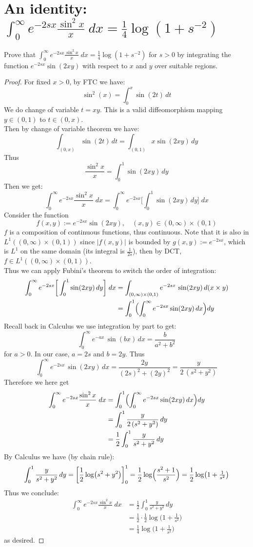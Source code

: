 \documentclass[lang=cn,11pt]{elegantbook}
\begin{document}
\section{An identity: $\int_0^\infty e^{-2sx}\frac{\sin^2x}{x}\;d x=\frac14\log(1+s^{-2})$}
  Prove that $\int_0^\infty e^{-2sx}\frac{\sin^2x}{x}\;d x=\frac14\log(1+s^{-2})$ for $s>0$ by integrating the function $e^{-2sx}\sin(2xy)$ with respect to $x$ and $y$ over suitable regions.
\begin{proof}
For fixed $x> 0$, by FTC we have:   \[\sin^2 (x)  = \int_0^x \sin(2t)\,dt\]
We do change of variable \(t = xy\). This is a valid diffeomorphism mapping $y\in (0,1)$ to $t \in (0,x)$.\\
Then by change of variable theorem we have: \[\int_{(0,x)} \sin(2t)\,dt = \int_{(0,1)}  x\sin(2xy)\,dy\]Thus \[
\frac{\sin^2 x}{x} = 
\int_0^1 \sin(2xy)\,dy
\]
Then we get: \[
\int_0^\infty e^{-2sx}\frac{\sin^2x}{x}\;d x = \int_0^\infty e^{-2sx}\bigg[\int_0^1 \sin(2xy)\,dy\bigg]\;d x
\]
Consider the function \[
f(x,y) := e^{-2sx}\sin(2xy),\quad (x,y) \in (0,\infty) \times (0,1)
\]
$f$ is a composition of continuous functions, thus continuous. Note that it is also in $L^1( (0,\infty) \times (0,1))$ since $|f(x,y)|$ is bounded by $g (x,y):= e^{-2sx}$, which is $L^1$ on the same domain (its integral is $\frac{1}{2s}$), then by DCT, $f \in L^1( (0,\infty) \times (0,1))$.\\
Thus we can apply Fubini's theorem to switch the order of integration: \begin{align}
    \int_0^\infty e^{-2sx}\bigg[\int_0^1 \sin(2xy)\,dy\bigg]\;d x &= \int_{(0,\infty) \times (0,1)} e^{-2sx}\,\sin(2xy)\,d (x\times y) \\
    &= \int_0^1 
\Bigl(\int_0^\infty e^{-2 s x} \sin(2xy)\,dx\Bigr)dy
\end{align}
Recall back in Calculus we use integration by part to get: \[
\int_0^\infty e^{-a x}\,\sin(b x)\,dx= 
\frac{b}{a^2 + b^2}
\]
for \(a>0\).  In our case, \(a = 2s\) and \(b = 2y\).
Thus \[
\int_0^\infty e^{-2 s x}\,\sin(2xy)\,dx =
\frac{2y}{(2s)^2 + (2y)^2} = 
\frac{y}{2\,(s^2 + y^2)}
\]
Therefore we here get \begin{align}
    \int_0^\infty e^{-2sx}\frac{\sin^2x}{x}\;d x  & =\int_0^1 
\Bigl(\int_0^\infty e^{-2 s x} \sin(2xy)\,dx\Bigr)dy\\
    &= \int_0^1 \frac{y}{2\,(s^2 + y^2)} \, dy \\
    & = \frac{1}{2 } \int_0^1 \frac{y}{s^2 + y^2} \, dy 
\end{align}
By Calculus we have (by chain rule): \[
\int_0^1 \frac{y}{s^2 + y^2}\,dy  =     \bigg[   \frac{1}{2}\log \bigl(s^2 + y^2\bigr)\bigg]_0^1  = \frac{1}{2}
\log\Bigl(\frac{s^2 + 1}{s^2}\Bigr) = 
\frac{1}{2}\log \bigl(1 + \tfrac1{s^2}\bigr)
\]
Thus we conclude: 
\begin{align}
    \int_0^\infty e^{-2sx}\frac{\sin^2x}{x}\;d x  &= \frac{1}{2 } \int_0^1 \frac{y}{s^2 + y^2} \, dy\\ &= \frac{1}{2} \cdot \frac{1}{2}\log \bigl(1 + \tfrac1{s^2}\bigr) \\
    &= \frac{1}{4}\log \bigl(1 + \tfrac1{s^2}\bigr)
\end{align}
as desired. 
\end{proof}
\end{document}
